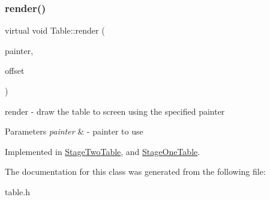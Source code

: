 \mbox{\label{class_table_a827dac18920a95b3e0ef006183514654}} 
\subsubsection{\texorpdfstring{render()}{render()}}
{\footnotesize\ttfamily virtual void Table\+::render (\begin{DoxyParamCaption}\item[{Q\+Painter \&}]{painter,  }\item[{const Q\+Vector2D \&}]{offset }\end{DoxyParamCaption})\hspace{0.3cm}{\ttfamily [pure virtual]}}



render -\/ draw the table to screen using the specified painter 


\begin{DoxyParams}{Parameters}
{\em painter} & -\/ painter to use \\
\hline
\end{DoxyParams}


Implemented in \mbox{\hyperlink{class_stage_two_table_ad19f7aa333b65d84b67ce2e55330a669}{Stage\+Two\+Table}}, and \mbox{\hyperlink{class_stage_one_table_a1f6dac59ce45c370f94fb3710f744ceb}{Stage\+One\+Table}}.



The documentation for this class was generated from the following file\+:\begin{DoxyCompactItemize}
\item 
table.\+h\end{DoxyCompactItemize}
